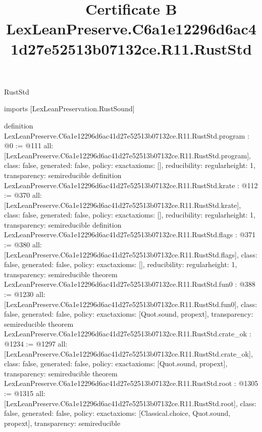 \begin{lexlean}{RustStd}
\title{Certificate B LexLeanPreserve.C6a1e12296d6ac41d27e52513b07132ce.R11.RustStd}
\begin{coremodule}
imports [LexLeanPreservation.RustSound]

definition LexLeanPreserve.C6a1e12296d6ac41d27e52513b07132ce.R11.RustStd.program : @0 := @111 {
  all: [LexLeanPreserve.C6a1e12296d6ac41d27e52513b07132ce.R11.RustStd.program],
  class: false,
  generated: false,
  policy: exact{axioms: []},
  reducibility: regular{height: 1},
  transparency: semireducible
}
definition LexLeanPreserve.C6a1e12296d6ac41d27e52513b07132ce.R11.RustStd.krate : @112 := @370 {
  all: [LexLeanPreserve.C6a1e12296d6ac41d27e52513b07132ce.R11.RustStd.krate],
  class: false,
  generated: false,
  policy: exact{axioms: []},
  reducibility: regular{height: 1},
  transparency: semireducible
}
definition LexLeanPreserve.C6a1e12296d6ac41d27e52513b07132ce.R11.RustStd.flags : @371 := @380 {
  all: [LexLeanPreserve.C6a1e12296d6ac41d27e52513b07132ce.R11.RustStd.flags],
  class: false,
  generated: false,
  policy: exact{axioms: []},
  reducibility: regular{height: 1},
  transparency: semireducible
}
theorem LexLeanPreserve.C6a1e12296d6ac41d27e52513b07132ce.R11.RustStd.fun0 : @388 := @1230 {
  all: [LexLeanPreserve.C6a1e12296d6ac41d27e52513b07132ce.R11.RustStd.fun0],
  class: false,
  generated: false,
  policy: exact{axioms: [Quot.sound, propext]},
  transparency: semireducible
}
theorem LexLeanPreserve.C6a1e12296d6ac41d27e52513b07132ce.R11.RustStd.crate_ok : @1234 := @1297 {
  all: [LexLeanPreserve.C6a1e12296d6ac41d27e52513b07132ce.R11.RustStd.crate_ok],
  class: false,
  generated: false,
  policy: exact{axioms: [Quot.sound, propext]},
  transparency: semireducible
}
theorem LexLeanPreserve.C6a1e12296d6ac41d27e52513b07132ce.R11.RustStd.root : @1305 := @1315 {
  all: [LexLeanPreserve.C6a1e12296d6ac41d27e52513b07132ce.R11.RustStd.root],
  class: false,
  generated: false,
  policy: exact{axioms: [Classical.choice, Quot.sound, propext]},
  transparency: semireducible
}


\end{coremodule}
\end{lexlean}
